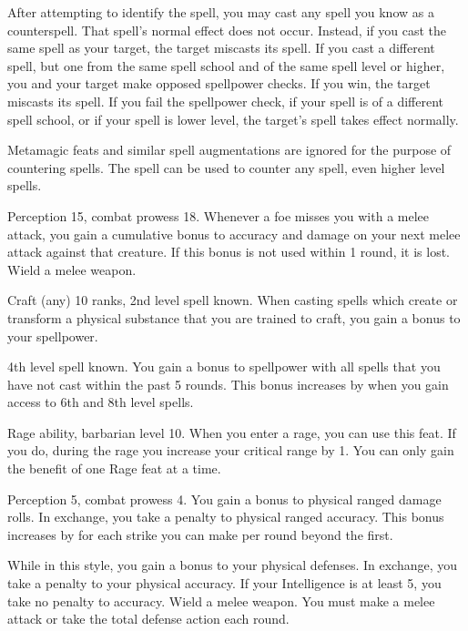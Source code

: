 After attempting to identify the spell, you may cast any spell you know as a counterspell.
That spell's normal effect does not occur.
Instead, if you cast the same spell as your target, the target miscasts its spell.
If you cast a different spell, but one from the same spell school and of the same spell level or higher, you and your target make opposed spellpower checks.
If you win, the target miscasts its spell.
If you fail the spellpower check, if your spell is of a different spell school, or if your spell is lower level, the target's spell takes effect normally.

Metamagic feats and similar spell augmentations are ignored for the purpose of countering spells.
The  spell can be used to counter any spell, even higher level spells.

\featpres Perception 15, combat prowess 18.
\featben Whenever a foe misses you with a melee attack, you gain a cumulative  bonus to accuracy and damage on your next melee attack against that creature.
If this bonus is not used within 1 round, it is lost.
\stylereq Wield a melee weapon.

\featpres Craft (any) 10 ranks, 2nd level spell known.
\featben When casting spells which create or transform a physical substance that you are trained to craft, you gain a  bonus to your spellpower.

\featpre 4th level spell known.
\featben You gain a  bonus to spellpower with all spells that you have not cast within the past 5 rounds.
This bonus increases by  when you gain access to 6th and 8th level spells.

\featpre Rage ability, barbarian level 10.
\featben When you enter a rage, you can use this feat. If you do, during the rage you increase your critical range by 1.
 You can only gain the benefit of one Rage feat at a time.

\featpres Perception 5, combat prowess 4.
\featben You gain a  bonus to physical ranged damage rolls.
In exchange, you take a  penalty to physical ranged accuracy.
This bonus increases by  for each strike you can make per round beyond the first.

\featben While in this style, you gain a  bonus to your physical defenses.
In exchange, you take a  penalty to your physical accuracy.
If your Intelligence is at least 5, you take no penalty to accuracy.
\stylereq Wield a melee weapon. You must make a melee attack or take the total defense action each round.

